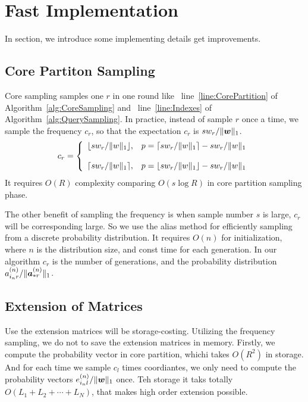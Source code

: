 \documentclass[letterpaper]{article}
\newcommand{\Sca}[3]{{#1}^{(#2)}_{i_#2#3}}%
\newcommand{\V}[1]{{\bm{{\MakeLowercase{#1}}}}}
\newcommand{\VnC}[3]{\V{#1}^{(#2)}_{#3}}
\newcommand{\Nrocl}[2]{\norm{\VnC{a}{#1}{*#2}}{1}}
\newcommand{\norm}[2]{\|#1\|_{#2}}
\newcommand{\AlgLine}[2]{line~\ref{line:#2} of Algorithm~\ref{alg:#1}}
\begin{document}
\section{Fast Implementation}
In section, we introduce some implementing details get improvements.
\subsection{Core Partiton Sampling}
Core sampling samples one $r$ in one round like
~\AlgLine{CoreSampling}{CorePartition} and ~\AlgLine{QuerySampling}{Indexes}.
In practice, instead of sample $r$ once a time,
we sample the frequency $c_r$,
so that the expectation $c_r$ is $sw_r/\norm{\V{w}}{1}$.
\begin{equation*}c_r=
    \left\{
      \begin{array}{ll}
        \lfloor sw_r/\norm{w}{1} \rfloor,
        & \hbox{$p=\lceil sw_r/\norm{w}{1} \rceil - sw_r/\norm{w}{1}$} \\\\
        \lceil sw_r/\norm{w}{1} \rceil,
        & \hbox{$p=\lfloor sw_r/\norm{w}{1} \rfloor - sw_r/\norm{w}{1}$}
      \end{array}
    \right.
\end{equation*}
It requires $O(R)$ complexity comparing $O(s\log{R})$ in core partition sampling phase.

The other benefit of sampling the frequency is when sample number $s$ is large,
$c_r$ will be corresponding large.
So we use the alias method\cite{Vose91}
for efficiently sampling from a discrete probability distribution.
It requires $O(n)$ for initialization, where $n$ is the distribution size, and
const time for each generation.
In our algorithm $c_r$ is the number of generations,
and the probability distribution ${\Sca{a}{n}{r}}/\Nrocl{n}{r}$.
\subsection{Extension of Matrices}
Use the extension matrices will be storage-costing.
Utilizing the frequency sampling, we do not to save the extension matrices in memory.
Firstly, we compute the probability vector in core partition, whichi takes $O(R^2)$ in storage.
And for each time we sample $c_l$ times coordiantes,
we only need to compute the probability vectors $e^{(n)}_{i_nl}/\norm{\V{w}}{1}$ once.
Teh storage it taks totally $O(L_1 + L_2 + \cdots + L_N)$,
that makes high order extension possible.
\end{document}
